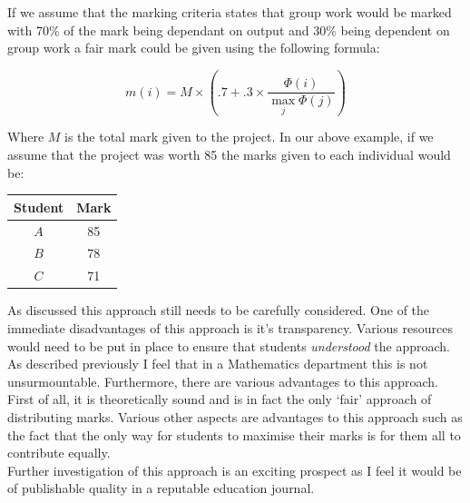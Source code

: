 \documentclass[a4paper,12pt]{article}
\begin{document}
If we assume that the marking criteria states that group work would be marked with 70\% of the mark being dependant on output and 30\% being dependent on group work a fair mark could be given using the following formula:

\begin{equation}
    m(i)=M\times\left(.7+.3\times\frac{\Phi(i)}{\max_{j}\Phi(j)}\right)
\end{equation}

Where $M$ is the total mark given to the project. In our above example, if we assume that the project was worth 85 the marks given to each individual would be:


\begin{center}
    \begin{tabular}{c|c}
        Student&Mark\\\hline
        $A$&85\\
        $B$&78\\
        $C$&71
    \end{tabular}
\end{center}

As discussed this approach still needs to be carefully considered. One of the immediate disadvantages of this approach is it's transparency. Various resources would need to be put in place to ensure that students \emph{understood} the approach. As described previously I feel that in a Mathematics department this is not unsurmountable. Furthermore, there are various advantages to this approach. First of all, it is theoretically sound and is in fact the only `fair' approach of distributing marks. Various other aspects are advantages to this approach such as the fact that the only way for students to maximise their marks is for them all to contribute equally.\\

Further investigation of this approach is an exciting prospect as I feel it would be of publishable quality in a reputable education journal.

\newpage


\end{document}

